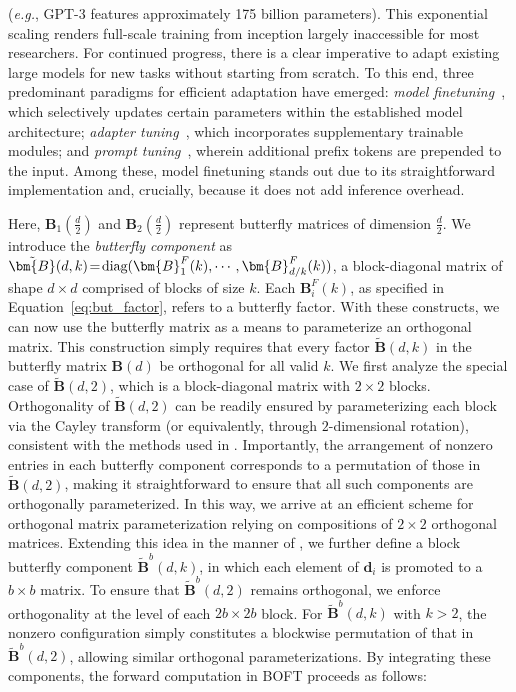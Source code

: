 (\emph{e.g.}, GPT-3 features approximately 175 billion parameters). This exponential scaling renders full-scale training from inception largely inaccessible for most researchers. For continued progress, there is a clear imperative to adapt existing large models for new tasks without starting from scratch. To this end, three predominant paradigms for efficient adaptation have emerged: \emph{model finetuning}~\cite{hulora2022,zaken2022bitfit,guo2020parameter,raffel2020exploring,qiu2023controlling,zhang2022adaptive,chavan2023one}, which selectively updates certain parameters within the established model architecture; \emph{adapter tuning}~\cite{rebuffi2017learning,houlsby2019parameter,pfeiffer2020adapterfusion,lin2020exploring,he2021towards}, which incorporates supplementary trainable modules; and \emph{prompt tuning}~\cite{li2021prefix,lester2021power}, wherein additional prefix tokens are prepended to the input. Among these, model finetuning stands out due to its straightforward implementation and, crucially, because it does not add inference overhead.

Here, $\bm{B}_1(\frac{d}{2})$ and $\bm{B}_2(\frac{d}{2})$ represent butterfly matrices of dimension $\frac{d}{2}$. We introduce the \emph{butterfly component} as $\thickmuskip=2mu \medmuskip=2mu \tilde{\bm{B}}(d,k)=\text{diag}(\bm{B}^F_1(k),\cdots,\bm{B}^F_{d/k}(k))$, a block-diagonal matrix of shape $d\times d$ comprised of blocks of size $k$. Each $\bm{B}^F_i(k)$, as specified in Equation~\ref{eq:but_factor}, refers to a butterfly factor. With these constructs, we can now use the butterfly matrix as a means to parameterize an orthogonal matrix. This construction simply requires that every factor $\tilde{\bm{B}}(d,k)$ in the butterfly matrix $\bm{B}(d)$ be orthogonal for all valid $k$. We first analyze the special case of $\tilde{\bm{B}}(d,2)$, which is a block-diagonal matrix with $2\times 2$ blocks. Orthogonality of $\tilde{\bm{B}}(d,2)$ can be readily ensured by parameterizing each block via the Cayley transform (or equivalently, through $2$-dimensional rotation), consistent with the methods used in \cite{liu2021orthogonal,qiu2023controlling}. Importantly, the arrangement of nonzero entries in each butterfly component corresponds to a permutation of those in $\tilde{\bm{B}}(d,2)$, making it straightforward to ensure that all such components are orthogonally parameterized. In this way, we arrive at an efficient scheme for orthogonal matrix parameterization relying on compositions of $2\times 2$ orthogonal matrices. Extending this idea in the manner of \cite{chen2022pixelated}, we further define a block butterfly component $\tilde{\bm{B}}^b(d,k)$, in which each element of $\bm{d}_i$ is promoted to a $b\times b$ matrix. To ensure that $\tilde{\bm{B}}^b(d,2)$ remains orthogonal, we enforce orthogonality at the level of each $2b\times 2b$ block. For $\tilde{\bm{B}}^b(d,k)$ with $k>2$, the nonzero configuration simply constitutes a blockwise permutation of that in $\tilde{\bm{B}}^b(d,2)$, allowing similar orthogonal parameterizations. By integrating these components, the forward computation in BOFT proceeds as follows:

